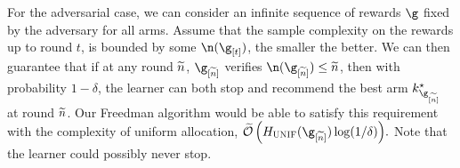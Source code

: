 For the adversarial case, we can consider
an infinite sequence of rewards $\gainVector$ fixed by 
the adversary for all arms.
% 
Assume that the sample complexity  on the rewards up to round $t$, 
is bounded by some $\n(\gainVector_{[t]})$, the smaller the better. 
We can then guarantee that  %
if at any round $\widetilde{n}$, 
$\gainVector_{[\tilde\timeHorizon]}$  verifies 
$\n(\gainVector_{[\tilde\timeHorizon]}) \leq \tilde\timeHorizon$, 
then with probability $1-\delta$, the learner can both 
stop and recommend the best arm $\bestArm_{\gainVector_{[\tilde\timeHorizon]}}$ 
at round $\widetilde{n}$.
Our Freedman algorithm would be able to satisfy this 
requirement with the complexity of uniform allocation,
$\tcO\left(\complexityUnif(\gainVector_{[\tilde\timeHorizon]})\log(1/\delta)\right)\!.$ %
Note that the learner could possibly never stop. 
%
%
% 
%
%
%
